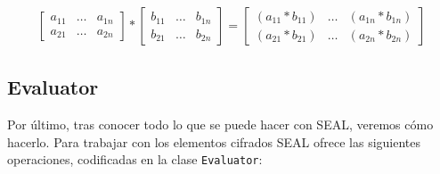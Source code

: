 \begin{gather}
    \begin{bmatrix}
        a_{11}  & \hdots    & a_{1n} \\
        a_{21}  & \hdots    & a_{2n}
    \end{bmatrix}
    *
    \begin{bmatrix}
        b_{11}  & \hdots    & b_{1n} \\
        b_{21}  & \hdots    & b_{2n}
    \end{bmatrix}
    =
    \begin{bmatrix}
        (a_{11} * b_{11})    & \hdots    & (a_{1n} * b_{1n}) \\
        (a_{21} * b_{21})    & \hdots    & (a_{2n} * b_{2n})
    \end{bmatrix}
\end{gather}



\subsection{Evaluator}

Por último, tras conocer todo lo que se puede hacer con SEAL, veremos cómo hacerlo. Para trabajar con los elementos cifrados SEAL ofrece las siguientes operaciones, codificadas en la clase \verb|Evaluator|:

